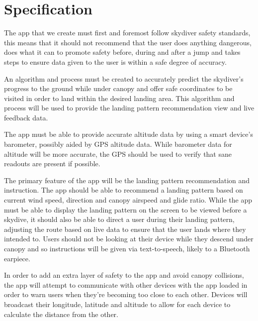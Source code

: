 \documentclass[11pt, a4paper, twocolumn]{article}
\begin{document}
\section{Specification}\label{sec:specification} %

The app that we create must first and foremost follow skydiver safety standards, this means that it should not recommend that the user does anything dangerous, does what it can to promote safety before, during and after a jump and takes steps to ensure data given to the user is within a safe degree of accuracy.

An algorithm and process must be created to accurately predict the skydiver's progress to the ground while under canopy and offer safe coordinates to be visited in order to land within the desired landing area. This algorithm and process will be used to provide the landing pattern recommendation view and live feedback data.

The app must be able to provide accurate altitude data by using a smart device's barometer, possibly aided by GPS altitude data. While barometer data for altitude will be more accurate, the GPS should be used to verify that sane readouts are present if possible.

The primary feature of the app will be the landing pattern recommendation and instruction. The app should be able to recommend a landing pattern based on current wind speed, direction and canopy airspeed and glide ratio. While the app must be able to display the landing pattern on the screen to be viewed before a skydive, it should also be able to direct a user during their landing pattern, adjusting the route based on live data to ensure that the user lands where they intended to. Users should not be looking at their device while they descend under canopy and so instructions will be given via text-to-speech, likely to a Bluetooth earpiece.

In order to add an extra layer of safety to the app and avoid canopy collisions, the app will attempt to communicate with other devices with the app loaded in order to warn users when they're becoming too close to each other. Devices will broadcast their longitude, latitude and altitude to allow for each device to calculate the distance from the other.
\end{document}
